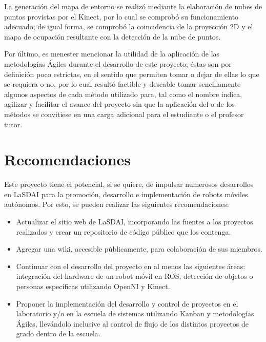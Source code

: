 La generación del mapa de entorno se realizó mediante la elaboración de nubes de puntos provistas por el Kinect, por lo cual se comprobó su funcionamiento adecuado; de igual forma, se comprobó la coincidencia de la proyección 2D y el mapa de ocupación resultante con la detección de la nube de puntos.

Por último, es menester mencionar la utilidad de la aplicación de las metodologías Ágiles durante el desarrollo de este proyecto; éstas son por definición poco estrictas, en el sentido que permiten tomar o dejar de ellas lo que se requiera o no, por lo cual resultó factible y deseable tomar sencillamente algunos aspectos de cada método utilizado para, tal como el nombre indica, agilizar y facilitar el avance del proyecto sin que la aplicación del o de los métodos se convitiese en una carga adicional para el estudiante o el profesor tutor.

\section{Recomendaciones}

Este proyecto tiene el potencial, si se quiere, de impulsar numerosos desarrollos en LaSDAI para la promoción, desarrollo e implementación de robots móviles autónomos. Por esto, se pueden realizar las siguientes recomendaciones:

\begin{itemize}
	\itemsep1pt \parskip1pt 
	\item Actualizar el sitio web de LaSDAI, incorporando las fuentes a los proyectos realizados y crear un repositorio de código público que los contenga.

	\item Agregar una wiki, accesible públicamente, para colaboración de sus miembros.

	\item Continuar con el desarrollo del proyecto en al menos las siguientes áreas: integración del hardware de un robot móvil en ROS, detección de objetos o personas específicas utilizando OpenNI y Kinect.

	\item Proponer la implementación del desarrollo y control de proyectos en el laboratorio y/o en la escuela de sistemas utilizando Kanban y metodologías Ágiles, llevándolo inclusive al control de flujo de los distintos proyectos de grado dentro de la escuela.
\end{itemize}